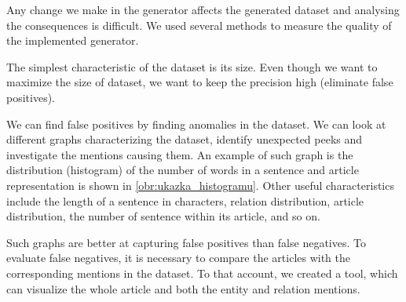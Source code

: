 Any change we make in the generator affects the generated dataset and analysing the consequences is difficult. We used several methods to measure the quality of the implemented generator.

The simplest characteristic of the dataset is its size. Even though we want to maximize the size of dataset, we want to keep the precision high (eliminate false positives).

We can find false positives by finding anomalies in the dataset. We can look at different graphs characterizing the dataset, identify unexpected peeks and investigate the mentions causing them. An example of such graph is the distribution (histogram) of the number of words in a sentence and article representation is shown in \autoref{obr:ukazka_histogramu}. Other useful characteristics include the length of a sentence in characters, relation distribution, article distribution, the number of sentence within its article, and so on.

Such graphs are better at capturing false positives than false negatives. To evaluate false negatives, it is necessary to compare the articles with the corresponding mentions in the dataset. To that account, we created a tool, which can visualize the whole article and both the entity and relation mentions.

